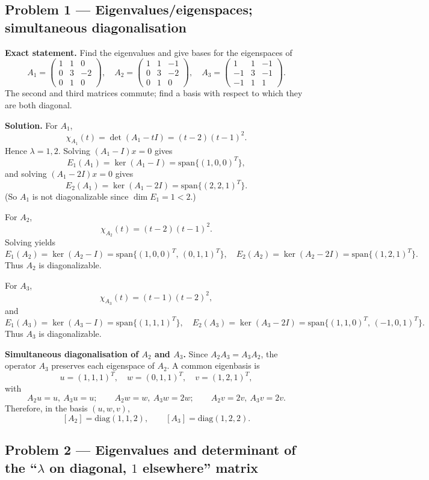 \documentclass[12pt,a4paper]{article}
\theoremstyle{plain}
\theoremstyle{definition}      %
\begin{document}
\subsection*{Problem 1 — Eigenvalues/eigenspaces; simultaneous diagonalisation}

\textbf{Exact statement.}
Find the eigenvalues and give bases for the eigenspaces of
\[
A_1=\begin{pmatrix}1&1&0\\0&3&-2\\0&1&0\end{pmatrix},\quad
A_2=\begin{pmatrix}1&1&-1\\0&3&-2\\0&1&0\end{pmatrix},\quad
A_3=\begin{pmatrix}1&1&-1\\-1&3&-1\\-1&1&1\end{pmatrix}.
\]
The second and third matrices commute; find a basis with respect to which they are both diagonal.

\textbf{Solution.}
For $A_1$,
\[
\chi_{A_1}(t)=\det(A_1-tI)=(t-2)(t-1)^2.
\]
Hence $\lambda=1,2$. Solving $(A_1-I)x=0$ gives
\[
E_1(A_1)=\ker(A_1-I)=\mathrm{span}\{(1,0,0)^T\},
\]
and solving $(A_1-2I)x=0$ gives
\[
E_2(A_1)=\ker(A_1-2I)=\mathrm{span}\{(2,2,1)^T\}.
\]
(So $A_1$ is not diagonalizable since $\dim E_1=1<2$.)

For $A_2$,
\[
\chi_{A_2}(t)=(t-2)(t-1)^2.
\]
Solving yields
\[
E_1(A_2)=\ker(A_2-I)=\mathrm{span}\{(1,0,0)^T,\,(0,1,1)^T\},
\quad
E_2(A_2)=\ker(A_2-2I)=\mathrm{span}\{(1,2,1)^T\}.
\]
Thus $A_2$ is diagonalizable.

For $A_3$,
\[
\chi_{A_3}(t)=(t-1)(t-2)^2,
\]
and
\[
E_1(A_3)=\ker(A_3-I)=\mathrm{span}\{(1,1,1)^T\},
\quad
E_2(A_3)=\ker(A_3-2I)=\mathrm{span}\{(1,1,0)^T,\,(-1,0,1)^T\}.
\]
Thus $A_3$ is diagonalizable.

\medskip
\textbf{Simultaneous diagonalisation of $A_2$ and $A_3$.}
Since $A_2A_3=A_3A_2$, the operator $A_3$ preserves each eigenspace of $A_2$.
A common eigenbasis is
\[
u=(1,1,1)^T,\quad w=(0,1,1)^T,\quad v=(1,2,1)^T,
\]
with
\[
A_2u=u,\ A_3u=u;\qquad A_2w=w,\ A_3w=2w;\qquad A_2v=2v,\ A_3v=2v.
\]
Therefore, in the basis $(u,w,v)$,
\[
[A_2]=\mathrm{diag}(1,1,2),\qquad [A_3]=\mathrm{diag}(1,2,2).
\]

\subsection*{Problem 2 — Eigenvalues and determinant of the ``$\lambda$ on diagonal, $1$ elsewhere'' matrix}
\end{document}
